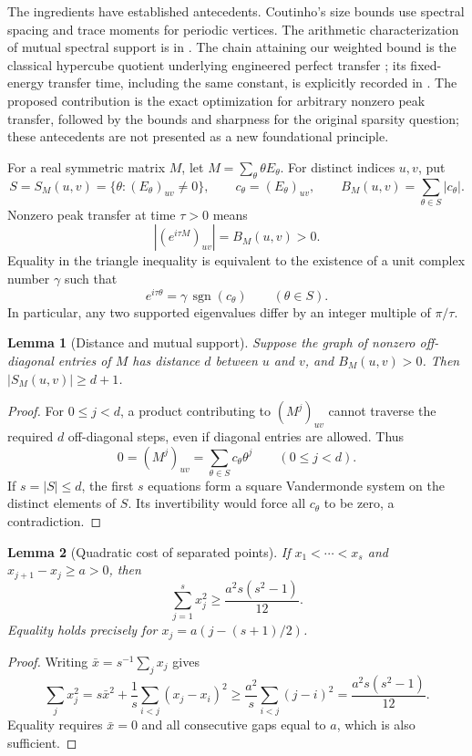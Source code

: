 \documentclass[11pt,a4paper]{article}
\newtheorem{lemma}{Lemma}[section]
\theoremstyle{definition}\newtheorem{definition}[lemma]{Definition}
\theoremstyle{remark}\newtheorem{remark}[lemma]{Remark}
\begin{document}
The ingredients have established antecedents. Coutinho's size bounds
\cite{Coutinho18} use spectral spacing and trace moments for periodic
vertices. The arithmetic characterization of mutual spectral support is in
\cite[Theorem~5.4]{CGS25}. The chain attaining our weighted bound is the
classical hypercube quotient underlying engineered perfect transfer
\cite{Christandl04}; its fixed-energy transfer time, including the same
constant, is explicitly recorded in \cite[equation~(17)]{Stepanenko25}.
The proposed contribution is the exact optimization
for arbitrary nonzero peak transfer, followed by the bounds and sharpness
for the original sparsity question; these antecedents are not presented
as a new foundational principle.

For a real symmetric matrix $M$, let
$M=\sum_\theta\theta E_\theta$. For distinct indices $u,v$, put
\[
 S=S_M(u,v)=\{\theta:(E_\theta)_{uv}\ne0\},\qquad
 c_\theta=(E_\theta)_{uv},\qquad B_M(u,v)=\sum_{\theta\in S}|c_\theta|.
\]
Nonzero peak transfer at time $\tau>0$ means
\[
 \left|(e^{i\tau M})_{uv}\right|=B_M(u,v)>0.
\]
Equality in the triangle inequality is equivalent to the existence of a
unit complex number $\gamma$ such that
\begin{equation}\label{eq:peak-alignment}
 e^{i\tau\theta}=\gamma\,\operatorname{sgn}(c_\theta)
 \qquad(\theta\in S).
\end{equation}
In particular, any two supported eigenvalues differ by an integer multiple
of $\pi/\tau$.

\begin{lemma}[Distance and mutual support]\label{lem:mutual-moments}
Suppose the graph of nonzero off-diagonal entries of $M$ has distance $d$
between $u$ and $v$, and $B_M(u,v)>0$. Then $|S_M(u,v)|\geq d+1$.
\end{lemma}
\begin{proof}
For $0\leq j<d$, a product contributing to $(M^j)_{uv}$ cannot traverse
the required $d$ off-diagonal steps, even if diagonal entries are allowed.
Thus
\[
 0=(M^j)_{uv}=\sum_{\theta\in S}c_\theta\theta^j\qquad(0\leq j<d).
\]
If $s=|S|\leq d$, the first $s$ equations form a square Vandermonde
system on the distinct elements of $S$. Its invertibility would force
all $c_\theta$ to be zero, a contradiction.
\end{proof}

\begin{lemma}[Quadratic cost of separated points]\label{lem:gap-energy}
If $x_1<\cdots<x_s$ and $x_{j+1}-x_j\geq a>0$, then
\begin{equation}\label{eq:separated-energy}
 \sum_{j=1}^s x_j^2\geq\frac{a^2s(s^2-1)}{12}.
\end{equation}
Equality holds precisely for $x_j=a(j-(s+1)/2)$.
\end{lemma}
\begin{proof}
Writing $\bar x=s^{-1}\sum_jx_j$ gives
\[
 \sum_jx_j^2=s\bar x^2+
       \frac1s\sum_{i<j}(x_j-x_i)^2
 \geq\frac{a^2}{s}\sum_{i<j}(j-i)^2
 =\frac{a^2s(s^2-1)}{12}.
\]
Equality requires $\bar x=0$ and all consecutive gaps equal to $a$,
which is also sufficient.
\end{proof}
\end{document}

